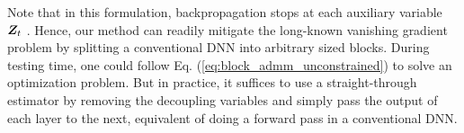 Note that in this formulation, %
backpropagation stops at each auxiliary variable ${\bm{Z}}_t$ . Hence, our method can readily mitigate the long-known vanishing gradient problem by splitting a conventional DNN into arbitrary sized blocks. 
During testing time, one could follow Eq. (\ref{eq:block_admm_unconstrained}) to solve an optimization problem. But in practice, it suffices to use a straight-through estimator by removing the decoupling variables and simply pass the output of each layer to the next, equivalent of doing a forward pass in a conventional DNN. %


